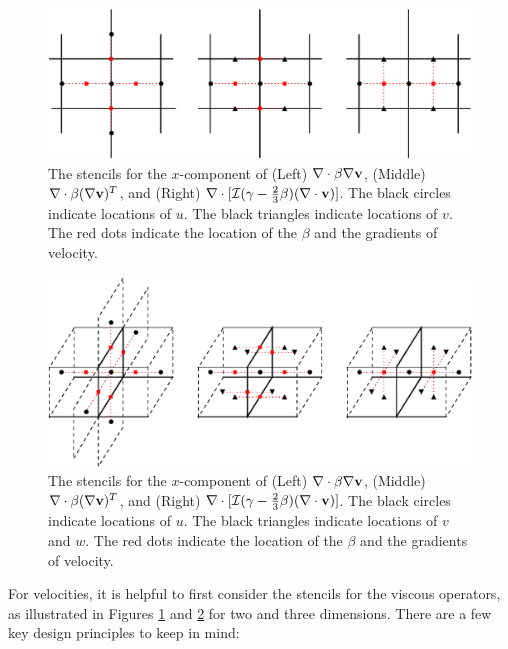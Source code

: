 \documentclass[final]{siamltex}
\def\vb {{\bf v}}
\begin{document}
\begin{figure}[tb]
\centering
\includegraphics[width=5.25in]{viscOp}
\caption{The stencils for the $x$-component of (Left) $\nabla\cdot\beta\nabla\vb$, (Middle) 
$\nabla\cdot\beta(\nabla\vb)^T$, and (Right) $\nabla\cdot[\mathcal{I}(\gamma-\frac{2}{3}\beta)(\nabla\cdot\vb)]$.  
The black circles indicate locations of $u$.
The black triangles indicate locations of $v$.
The red dots indicate the location of the $\beta$ and the gradients of velocity.}\label{fig:viscOp}
\end{figure}
\begin{figure}[tb]
\centering
\includegraphics[width=5.25in]{viscOp_3d}
\caption{The stencils for the $x$-component of (Left) $\nabla\cdot\beta\nabla\vb$, (Middle) 
$\nabla\cdot\beta(\nabla\vb)^T$, and (Right) $\nabla\cdot[\mathcal{I}(\gamma-\frac{2}{3}\beta)(\nabla\cdot\vb)]$.  
The black circles indicate locations of $u$.
The black triangles indicate locations of $v$ and $w$.
The red dots indicate the location of the $\beta$ and the gradients of velocity.}\label{fig:viscOp_3d}
\end{figure}
For velocities, it is helpful to first consider the stencils 
for the viscous operators, as illustrated
in Figures \ref{fig:viscOp} and \ref{fig:viscOp_3d} for two and three dimensions.
There are a few key design principles to keep in mind:\\
\end{document}
